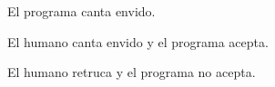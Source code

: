\documentclass[12pt,a4paper]{article}
\begin{document}
\begin{figure}
\noindent {}
\caption{El programa canta envido.}
\end{figure}

\begin{figure}
\noindent {}
\caption {El humano canta envido y el programa acepta.}
\end{figure}

\begin{figure}
\noindent {}
\caption {El humano retruca y el programa no acepta.}
\end{figure}
\end{document}
